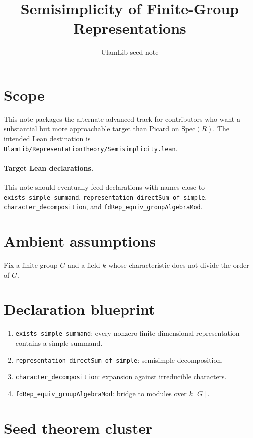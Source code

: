 \documentclass[11pt]{article}
\title{Semisimplicity of Finite-Group Representations}
\author{UlamLib seed note}
\date{}
\begin{document}
\maketitle

\section{Scope}

This note packages the alternate advanced track for contributors who want a
substantial but more approachable target than Picard on $\mathrm{Spec}(R)$. The
intended Lean destination is
\texttt{UlamLib/RepresentationTheory/Semisimplicity.lean}.

\paragraph{Target Lean declarations.}
This note should eventually feed declarations with names close to
\texttt{exists\_simple\_summand}, \texttt{representation\_directSum\_of\_simple},
\texttt{character\_decomposition}, and \texttt{fdRep\_equiv\_groupAlgebraMod}.

\section{Ambient assumptions}

Fix a finite group $G$ and a field $k$ whose characteristic does not divide the
order of $G$.

\section{Declaration blueprint}

\begin{enumerate}
\item \texttt{exists\_simple\_summand}: every nonzero finite-dimensional
representation contains a simple summand.
\item \texttt{representation\_directSum\_of\_simple}: semisimple decomposition.
\item \texttt{character\_decomposition}: expansion against irreducible
characters.
\item \texttt{fdRep\_equiv\_groupAlgebraMod}: bridge to modules over $k[G]$.
\end{enumerate}

\section{Seed theorem cluster}
\end{document}
